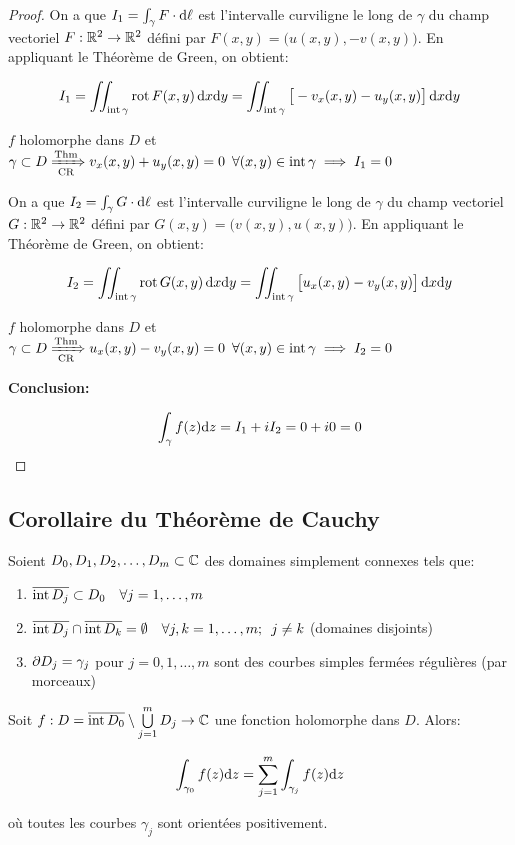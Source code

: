 \begin{proof}
    On a que $I_1 = \int_\gamma F \cdot \mathrm{d}\ell$ est l'intervalle curviligne le long de $\gamma$ du champ vectoriel $F: \mathbb{R}^2 \rightarrow \mathbb{R}^2$ défini par $F(x,y) = \big(u(x,y),-v(x,y)\big)$.
    En appliquant le Théorème de Green, on obtient:
    
    \[
    I_1 = \iint_{\textrm{int}\,\gamma} \textrm{rot}\, F(x,y) \, \mathrm{d}x\mathrm{d}y
    = \iint_{\textrm{int}\,\gamma} \big[-v_x(x,y) - u_y(x,y)\big] \, \mathrm{d}x\mathrm{d}y
    \]
    
    $f$ holomorphe dans $D$ et $\gamma \subset D \xRightarrow[\textrm{CR}]{\textrm{Thm}} v_x(x,y) + u_y(x,y) = 0 \enspace \forall(x,y) \in \textrm{int}\,\gamma \implies I_1 = 0$
    
    On a que $I_2 = \int_\gamma G \cdot \mathrm{d}\ell$ est l'intervalle curviligne le long de $\gamma$ du champ vectoriel $G: \mathbb{R}^2 \rightarrow \mathbb{R}^2$ défini par $G(x,y) = \big(v(x,y),u(x,y)\big)$.
    En appliquant le Théorème de Green, on obtient:
    
    \[
    I_2 = \iint_{\textrm{int}\,\gamma} \textrm{rot}\, G(x,y) \, \mathrm{d}x\mathrm{d}y
    = \iint_{\textrm{int}\,\gamma} \big[u_x(x,y) - v_y(x,y)\big] \, \mathrm{d}x\mathrm{d}y
    \]
    
    $f$ holomorphe dans $D$ et $\gamma \subset D \xRightarrow[\textrm{CR}]{\textrm{Thm}} u_x(x,y) - v_y(x,y) = 0 \enspace \forall(x,y) \in \textrm{int}\,\gamma \implies I_2 = 0$
    
    \textbf{Conclusion:}
    
    \[\int_\gamma f(z) \mathrm{d}z = I_1 + iI_2 = 0 + i0 = 0\]
\end{proof}

\subsection{Corollaire du Théorème de Cauchy}

\begin{corollary}
    Soient $D_0,D_1,D_2,\ldots,D_m \subset \mathbb{C}$ des domaines simplement connexes tels que:
    
    \begin{enumerate}[label=\arabic{enumi})]
    \item 
    $\overline{\textrm{int}\, D_j} \subset D_0 \quad \forall j = 1,\ldots,m$
    \item 
    $\overline{\textrm{int}\, D_j} \cap \overline{\textrm{int}\, D_k} = \emptyset \quad \forall j,k = 1,\ldots,m; \enspace j \neq k$ (domaines disjoints)
    \item 
    $\partial D_j = \gamma_j$ pour $j=0,1,\ldots,m$ sont des courbes simples fermées régulières (par morceaux)
    \end{enumerate}

    Soit $f: D = \overline{\textrm{int}\, D_0} \setminus \bigcup\limits_{j=1}^m D_j \rightarrow \mathbb{C}$ une fonction holomorphe dans $D$.
    Alors:
    
    \[
    \int_{\gamma_0} f(z) \mathrm{d}z = \sum_{j=1}^m \int_{\gamma_j} f(z) \mathrm{d}z
    \]
    
    où toutes les courbes $\gamma_j$ sont orientées positivement. %
\end{corollary}

